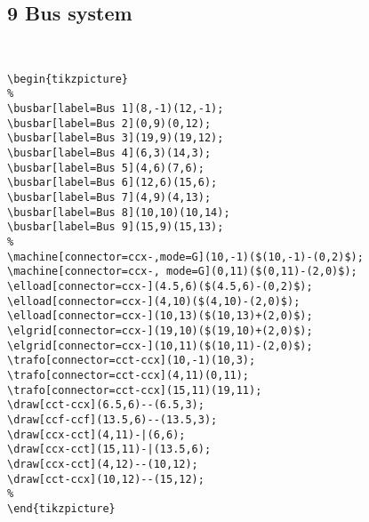 \documentclass[a4]{article}
\begin{document}
\subsection{9 Bus system} \
\begin{small}
\begin{verbatim}
\begin{tikzpicture}
%
\busbar[label=Bus 1](8,-1)(12,-1);
\busbar[label=Bus 2](0,9)(0,12);
\busbar[label=Bus 3](19,9)(19,12);
\busbar[label=Bus 4](6,3)(14,3);
\busbar[label=Bus 5](4,6)(7,6);
\busbar[label=Bus 6](12,6)(15,6);
\busbar[label=Bus 7](4,9)(4,13);
\busbar[label=Bus 8](10,10)(10,14);
\busbar[label=Bus 9](15,9)(15,13);
%
\machine[connector=ccx-,mode=G](10,-1)($(10,-1)-(0,2)$);
\machine[connector=ccx-, mode=G](0,11)($(0,11)-(2,0)$);
\elload[connector=ccx-](4.5,6)($(4.5,6)-(0,2)$);
\elload[connector=ccx-](4,10)($(4,10)-(2,0)$);
\elload[connector=ccx-](10,13)($(10,13)+(2,0)$);
\elgrid[connector=ccx-](19,10)($(19,10)+(2,0)$);
\elgrid[connector=ccx-](10,11)($(10,11)-(2,0)$);
\trafo[connector=cct-ccx](10,-1)(10,3);
\trafo[connector=cct-ccx](4,11)(0,11);
\trafo[connector=cct-ccx](15,11)(19,11);
\draw[cct-ccx](6.5,6)--(6.5,3); 
\draw[ccf-ccf](13.5,6)--(13.5,3); 
\draw[ccx-cct](4,11)-|(6,6); 
\draw[ccx-cct](15,11)-|(13.5,6);
\draw[ccx-cct](4,12)--(10,12); 
\draw[cct-ccx](10,12)--(15,12); 
%
\end{tikzpicture}
\end{verbatim}
\end{small}
\end{document}
